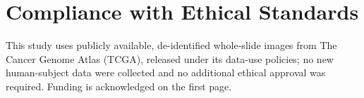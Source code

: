 \documentclass{article}
\begin{document}



\section*{Compliance with Ethical Standards}
This study uses publicly available, de-identified whole-slide images from The Cancer Genome Atlas (TCGA), released under its data-use policies; no new human-subject data were collected and no additional ethical approval was required. Funding is acknowledged on the first page.
\end{document}

